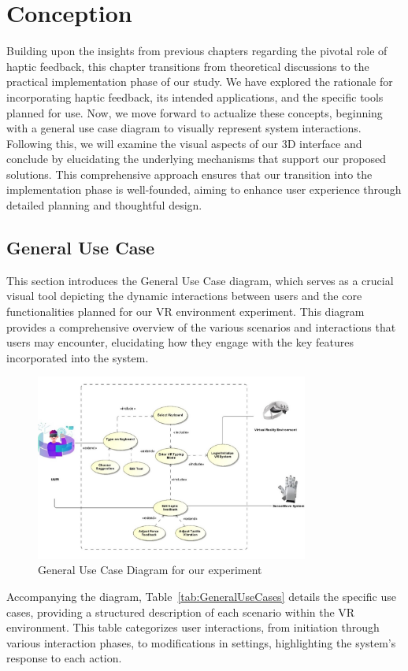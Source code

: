 \chapter{Conception}
\label{sec:Conception}

Building upon the insights from previous chapters regarding the pivotal role of haptic feedback, this chapter transitions from theoretical discussions to the practical implementation phase of our study. We have explored the rationale for incorporating haptic feedback, its intended applications, and the specific tools planned for use. Now, we move forward to actualize these concepts, beginning with a general use case diagram to visually represent system interactions. Following this, we will examine the visual aspects of our 3D interface and conclude by elucidating the underlying mechanisms that support our proposed solutions. This comprehensive approach ensures that our transition into the implementation phase is well-founded, aiming to enhance user experience through detailed planning and thoughtful design.

\section{General Use Case}
\label{sec:GeneralUseCase}

This section introduces the General Use Case diagram, which serves as a crucial visual tool depicting the dynamic interactions between users and the core functionalities planned for our \ac{VR} environment experiment. This diagram provides a comprehensive overview of the various scenarios and interactions that users may encounter, elucidating how they engage with the key features incorporated into the system.

\begin{figure}[ht]
\centering
\includegraphics[width=0.8\textwidth]{Development/Picture1.jpg}
\caption{General Use Case Diagram for our experiment}
\label{fig:GeneralUseCaseDiagram} 
\end{figure}
\noindent Accompanying the diagram, Table~\ref{tab:GeneralUseCases} details the specific use cases, providing a structured description of each scenario within the \ac{VR} environment. This table categorizes user interactions, from initiation through various interaction phases, to modifications in settings, highlighting the system's response to each action.

